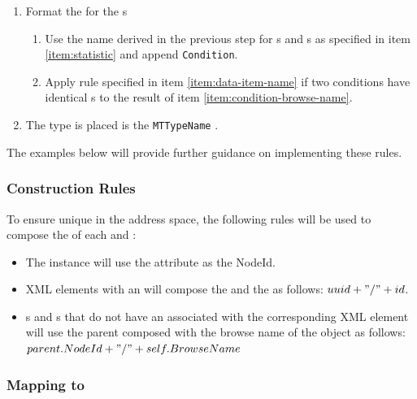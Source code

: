 \begin{enumerate}
\item Format the  for the  s
    \begin{enumerate}
    \item Use the name derived in the previous step for s and s as specified in item \ref{item:statistic} and append \texttt{Condition}. \label{item:condition-browse-name}
    \item Apply rule specified in item \ref{item:data-item-name} if two conditions have identical s to the result of item \ref{item:condition-browse-name}.
    \end{enumerate}
    
\item The type is placed is the \texttt{MTTypeName} .
\end{enumerate}

The examples below will provide further guidance on implementing these rules.

\subsubsection{ Construction Rules}

To ensure unique  in the address space, the following rules will be used to compose the  of each  and :

\begin{itemize}
    \item The  instance will use the  attribute as the NodeId.
    \item XML elements with an  will compose the   and the  as follows: $uuid + "/" + id$.
    \item {}s and s that do not have an  associated with the corresponding XML element will use the parent  composed with the browse name of the object as follows: $parent.NodeId + "/" + self.BrowseName$
\end{itemize}

\subsubsection{Mapping   to }

